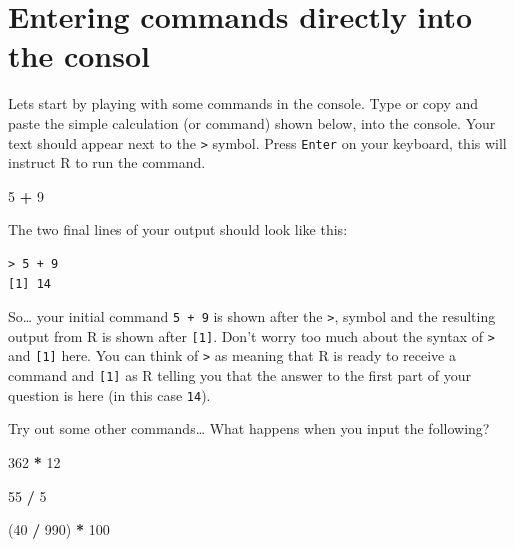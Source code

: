 \documentclass[
]{book}
\newenvironment{Shaded}{\begin{snugshade}}{\end{snugshade}}
\newcommand{\DecValTok}[1]{\textcolor[rgb]{0.00,0.00,0.81}{#1}}
\newcommand{\NormalTok}[1]{#1}
\newcommand{\SpecialCharTok}[1]{\textcolor[rgb]{0.81,0.36,0.00}{\textbf{#1}}}
\begin{document}
\hypertarget{entering-commands-directly-into-the-consol}{%
\section{Entering commands directly into the consol}\label{entering-commands-directly-into-the-consol}}

Lets start by playing with some commands in the console. Type or copy and paste the simple calculation (or command) shown below, into the console. Your text should appear next to the \texttt{\textgreater{}} symbol. Press \texttt{Enter} on your keyboard, this will instruct R to run the command.

\begin{Shaded}
\begin{Highlighting}[]
\DecValTok{5} \SpecialCharTok{+} \DecValTok{9}
\end{Highlighting}
\end{Shaded}

The two final lines of your output should look like this:

\begin{verbatim}
> 5 + 9
[1] 14
\end{verbatim}

So\ldots{} your initial command \texttt{5\ +\ 9} is shown after the \texttt{\textgreater{}}, symbol and the resulting output from R is shown after \texttt{{[}1{]}}. Don't worry too much about the syntax of \texttt{\textgreater{}} and \texttt{{[}1{]}} here. You can think of \texttt{\textgreater{}} as meaning that R is ready to receive a command and \texttt{{[}1{]}} as R telling you that the answer to the first part of your question is here (in this case \texttt{14}).

Try out some other commands\ldots{} What happens when you input the following?

\begin{Shaded}
\begin{Highlighting}[]
\DecValTok{362} \SpecialCharTok{*} \DecValTok{12}
\end{Highlighting}
\end{Shaded}

\begin{Shaded}
\begin{Highlighting}[]
\DecValTok{55} \SpecialCharTok{/} \DecValTok{5}
\end{Highlighting}
\end{Shaded}

\begin{Shaded}
\begin{Highlighting}[]
\NormalTok{(}\DecValTok{40} \SpecialCharTok{/} \DecValTok{990}\NormalTok{) }\SpecialCharTok{*} \DecValTok{100}
\end{Highlighting}
\end{Shaded}
\end{document}
